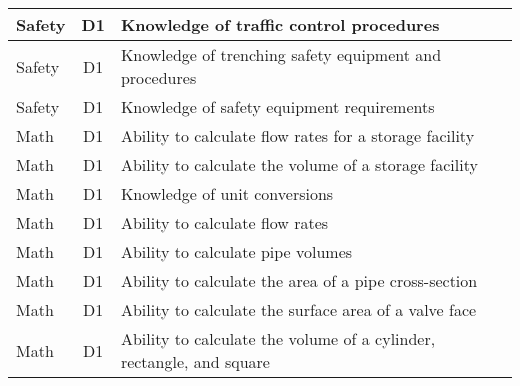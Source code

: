 \documentclass{article}
\begin{document}
\begin{table}[]
\begin{tabular}{|l|c|l|}
Safety                                 & D1             & Knowledge of traffic   control procedures                                                                                         \\ \hline
Safety                                 & D1             & Knowledge of   trenching safety equipment and procedures                                                                          \\ \hline
Safety                                 & D1             & Knowledge of safety   equipment requirements                                                                                      \\ \hline
Math                                   & D1             & Ability to calculate   flow rates for a storage facility                                                                          \\ \hline
Math                                   & D1             & Ability to calculate   the volume of a storage facility                                                                           \\ \hline
Math                                   & D1             & Knowledge of unit   conversions                                                                                                   \\ \hline
Math                                   & D1             & Ability to calculate   flow rates                                                                                                 \\ \hline
Math                                   & D1             & Ability to calculate   pipe volumes                                                                                               \\ \hline
Math                                   & D1             & Ability to calculate   the area of a pipe cross-section                                                                           \\ \hline
Math                                   & D1             & Ability to calculate   the surface area of a valve face                                                                           \\ \hline
Math                                   & D1             & Ability to calculate   the volume of a cylinder, rectangle, and square                                                            \\ \hline

\end{tabular}
\end{table}
\end{document}
